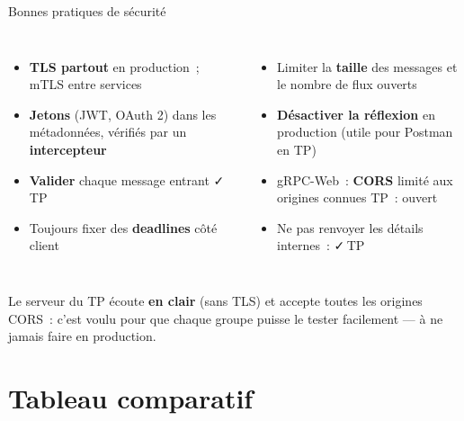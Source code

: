 \documentclass[aspectratio=169,11pt]{beamer}
\begin{document}
\begin{frame}{Bonnes pratiques de sécurité}
  \begin{columns}[T,onlytextwidth]
    \begin{itemize}\small
      \item \textbf{TLS partout} en production~; mTLS entre services
      \item \textbf{Jetons} (JWT, OAuth 2) dans les métadonnées, vérifiés par un \textbf{intercepteur}
      \item \textbf{Valider} chaque message entrant \hfill{\color{Vert}\faCheck\,TP}
      \item Toujours fixer des \textbf{deadlines} côté client
    \end{itemize}
    \begin{itemize}\small
      \item Limiter la \textbf{taille} des messages et le nombre de flux ouverts
      \item \textbf{Désactiver la réflexion} en production {\scriptsize(utile pour Postman en TP)}
      \item gRPC-Web~: \textbf{CORS} limité aux origines connues \hfill{\color{Amber}TP~: ouvert}
      \item Ne pas renvoyer les détails internes~:  \hfill{\color{Vert}\faCheck\,TP}
    \end{itemize}
  \end{columns}
  \vspace{0.3cm}
  \begin{carte}[gamber]\small\faExclamationTriangle\enspace Le serveur du TP écoute \textbf{en clair} (sans TLS) et accepte toutes les origines CORS~:
  c'est voulu pour que chaque groupe puisse le tester facilement — à ne jamais faire en production.\end{carte}
\end{frame}

\section{Tableau comparatif}
\end{document}
